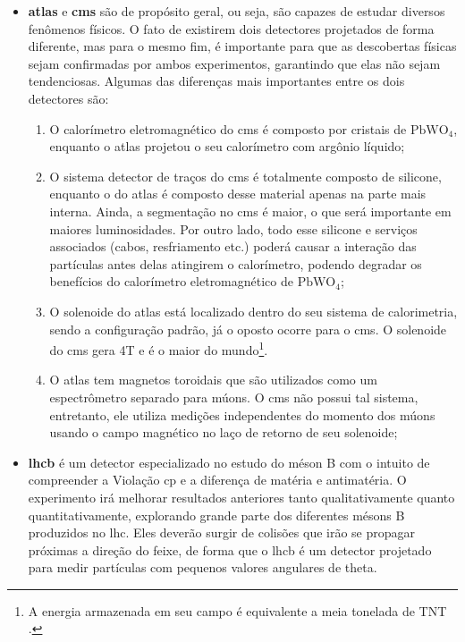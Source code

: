 \begin{itemize}
\item \textbf{\gls{atlas}} e \textbf{\gls{cms}} são de propósito geral, ou seja, são capazes de estudar 
diversos fenômenos físicos. O fato de existirem dois detectores projetados de forma
diferente, mas para o mesmo fim, é importante para que as descobertas físicas
sejam confirmadas por ambos experimentos, garantindo que elas não sejam
tendenciosas. Algumas das diferenças mais importantes entre os dois detectores são:
\begin{enumerate}
\item O calorímetro eletromagnético do \gls{cms} é composto por cristais de
$\text{PbWO}_4$, enquanto o
\gls{atlas} projetou o seu calorímetro com argônio líquido;
\item O sistema detector de traços do \gls{cms} é totalmente composto de
silicone, enquanto o do \gls{atlas} é composto desse material apenas na parte mais
interna. Ainda, a segmentação no \gls{cms} é maior, o que será importante em
maiores luminosidades.
Por outro lado, todo esse silicone e serviços associados (cabos, resfriamento
etc.) poderá causar a interação das partículas antes delas atingirem o calorímetro,
podendo degradar os benefícios do calorímetro eletromagnético de $\text{PbWO}_4$;
\item O solenoide do \gls{atlas} está localizado dentro do seu sistema de
calorimetria, sendo a configuração padrão, já o oposto ocorre para o \gls{cms}.
O solenoide do \gls{cms} gera 4T e é o maior do mundo\footnote{A energia
armazenada em seu campo é equivalente a meia tonelada de TNT \cite{closerLook}.}.
\item O \gls{atlas} tem magnetos toroidais que são utilizados como um
espectrômetro separado para múons. O \gls{cms} não possui tal
sistema, entretanto, ele utiliza medições independentes do momento dos múons
usando o campo magnético no laço de retorno de seu solenoide;
\end{enumerate}
\item \textbf{\gls{lhcb}} é um detector especializado no estudo do méson B com o
intuito de compreender a Violação \gls{cp} e a diferença de matéria e
antimatéria. O experimento irá melhorar resultados anteriores tanto
qualitativamente quanto quantitativamente, explorando grande parte dos
diferentes mésons B produzidos no \gls{lhc}. Eles deverão surgir de colisões que
irão se propagar próximas a direção do feixe, de forma que o \gls{lhcb} 
é um detector projetado para medir partículas com pequenos valores angulares
de \gls{theta}.

\end{itemize}
